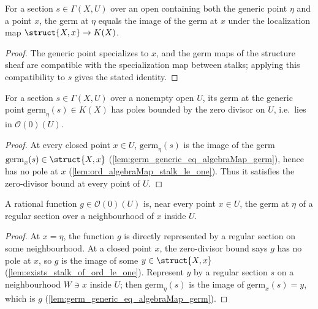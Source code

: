 \begin{lemma}
  \label{lem:germ_generic_eq_algebraMap_germ}
  \leanok
  For a section \(s \in \Gamma(X, U)\) over an open containing both the generic point \(\eta\) and a
  point \(x\), the germ at \(\eta\) equals the image of the germ at \(x\) under the localization map
  \(\struct{X,x} \to K(X)\).
\end{lemma}
\begin{proof}
  \leanok
  The generic point specializes to \(x\), and the germ maps of the structure sheaf are compatible
  with the specialization map between stalks; applying this compatibility to \(s\) gives the stated
  identity.
\end{proof}

\begin{lemma}
  \label{lem:germGenericLinear_mem}
  \leanok
  For a section \(s \in \Gamma(X, U)\) over a nonempty open \(U\), its germ at the generic point
  \(\mathrm{germ}_\eta(s) \in K(X)\) has poles bounded by the zero divisor on \(U\), i.e.\ lies in
  \(\mathcal O(0)(U)\).
\end{lemma}
\begin{proof}
  \leanok
  At every closed point \(x \in U\), \(\mathrm{germ}_\eta(s)\) is the image of the germ
  \(\mathrm{germ}_x(s) \in \struct{X,x}\) (\ref{lem:germ_generic_eq_algebraMap_germ}), hence has no
  pole at \(x\) (\ref{lem:ord_algebraMap_stalk_le_one}). Thus it satisfies the zero-divisor bound at
  every point of \(U\).
\end{proof}

\begin{lemma}
  \label{lem:exists_local_section}
  \leanok
  A rational function \(g \in \mathcal O(0)(U)\) is, near every point \(x \in U\), the germ at
  \(\eta\) of a regular section over a neighbourhood of \(x\) inside \(U\).
\end{lemma}
\begin{proof}
  \leanok
  At \(x = \eta\), the function \(g\) is directly represented by a regular section on some
  neighbourhood. At a closed point \(x\), the zero-divisor bound says \(g\) has no pole at \(x\), so
  \(g\) is the image of some \(y \in \struct{X,x}\) (\ref{lem:exists_stalk_of_ord_le_one}). Represent
  \(y\) by a regular section \(s\) on a neighbourhood \(W \ni x\) inside \(U\); then
  \(\mathrm{germ}_\eta(s)\) is the image of \(\mathrm{germ}_x(s) = y\), which is \(g\)
  (\ref{lem:germ_generic_eq_algebraMap_germ}).
\end{proof}

